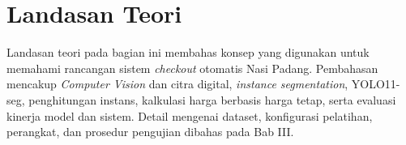 \section{Landasan Teori}

Landasan teori pada bagian ini membahas konsep yang digunakan untuk memahami rancangan sistem \textit{checkout} otomatis Nasi Padang. Pembahasan mencakup \textit{Computer Vision} dan citra digital, \textit{instance segmentation}, YOLO11-seg, penghitungan instans, kalkulasi harga berbasis harga tetap, serta evaluasi kinerja model dan sistem. Detail mengenai dataset, konfigurasi pelatihan, perangkat, dan prosedur pengujian dibahas pada Bab III.








